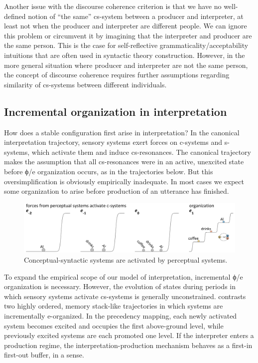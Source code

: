   Another issue with the discourse coherence criterion is that we have no well-defined notion of “the same” cs-system between a producer and interpreter, at least not when the producer and interpreter are different people. We can ignore this problem or circumvent it by imagining that the interpreter and producer are the same person. This is the case for self-reflective grammaticality/acceptability intuitions that are often used in syntactic theory construction. However, in the more general situation where producer and interpreter are not the same person, the concept of discourse coherence requires further assumptions regarding similarity of cs-systems between different individuals.  

\subsection{Incremental organization in interpretation}

How does a stable configuration first arise in interpretation? In the canonical interpretation trajectory, sensory systems exert forces on c-systems and s-systems, which activate them and induce cs-resonances. The canonical trajectory makes the assumption that all cs-resonances were in an active, unexcited state before ϕ/e organization occurs, as in the trajectories below. But this oversimplification is obviously empirically inadequate. In most cases we expect some organization to arise before production of an utterance has finished.

  
\begin{figure}
\includegraphics[width=\textwidth]{figures/Tilsen-img127.png}
\caption{Conceptual-syntactic systems are activated by perceptual systems.}
\label{fig:6:8}
\end{figure}

 

  To expand the empirical scope of our model of interpretation, incremental ϕ/e organization is necessary. However, the evolution of states during periods in which sensory systems activate cs-systems is generally unconstrained. {} contrasts two highly ordered, memory stack-like trajectories in which systems are incrementally e-organized. In the precedency mapping, each newly activated system becomes excited and occupies the first above-ground level, while previously excited systems are each promoted one level. If the interpreter enters a production regime, the interpretation-production mechanism behaves as a first-in first-out buffer, in a sense. 

